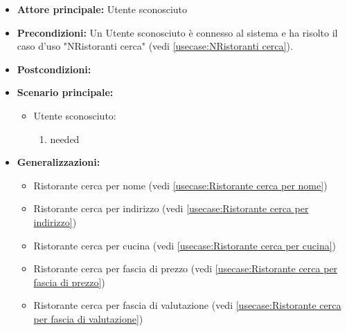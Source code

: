 \label{usecase:Ristoranti cerca}
\begin{itemize}
\item \textbf{Attore principale:} Utente sconosciuto
\item \textbf{Precondizioni:}
Un Utente sconosciuto è connesso al sistema e ha risolto il caso d'uso "NRistoranti cerca" (vedi \autoref{usecase:NRistoranti cerca}).
\item \textbf{Postcondizioni:}
\item \textbf{Scenario principale:}
\begin{itemize}
\item Utente sconosciuto:
\begin{enumerate}
\item needed
\end{enumerate}
\end{itemize}
\item \textbf{Generalizzazioni:}
\begin{itemize}
\item Ristorante cerca per nome (vedi \autoref{usecase:Ristorante cerca per nome})\item Ristorante cerca per indirizzo (vedi \autoref{usecase:Ristorante cerca per indirizzo})\item Ristorante cerca per cucina (vedi \autoref{usecase:Ristorante cerca per cucina})\item Ristorante cerca per fascia di prezzo (vedi \autoref{usecase:Ristorante cerca per fascia di prezzo})\item Ristorante cerca per fascia di valutazione (vedi \autoref{usecase:Ristorante cerca per fascia di valutazione})
\end{itemize}
\end{itemize}